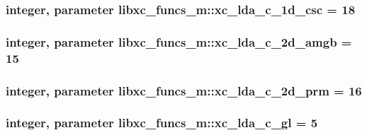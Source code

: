 \hypertarget{classlibxc__funcs__m_ac253e07010d2eb729a0c1870073026d8}{
\subsubsection[{xc\-\_\-lda\-\_\-c\-\_\-1d\-\_\-csc}]{\setlength{\rightskip}{0pt plus 5cm}integer, parameter libxc\-\_\-funcs\-\_\-m\-::xc\-\_\-lda\-\_\-c\-\_\-1d\-\_\-csc = 18}}\label{classlibxc__funcs__m_ac253e07010d2eb729a0c1870073026d8}
\hypertarget{classlibxc__funcs__m_a48adc34580788ace464a6380f36e2876}{
\subsubsection[{xc\-\_\-lda\-\_\-c\-\_\-2d\-\_\-amgb}]{\setlength{\rightskip}{0pt plus 5cm}integer, parameter libxc\-\_\-funcs\-\_\-m\-::xc\-\_\-lda\-\_\-c\-\_\-2d\-\_\-amgb = 15}}\label{classlibxc__funcs__m_a48adc34580788ace464a6380f36e2876}
\hypertarget{classlibxc__funcs__m_a593e255bea3463920a8a450d2f81076a}{
\subsubsection[{xc\-\_\-lda\-\_\-c\-\_\-2d\-\_\-prm}]{\setlength{\rightskip}{0pt plus 5cm}integer, parameter libxc\-\_\-funcs\-\_\-m\-::xc\-\_\-lda\-\_\-c\-\_\-2d\-\_\-prm = 16}}\label{classlibxc__funcs__m_a593e255bea3463920a8a450d2f81076a}
\hypertarget{classlibxc__funcs__m_aafaa72ece19c0113cd8ec81b69f7f407}{
\subsubsection[{xc\-\_\-lda\-\_\-c\-\_\-gl}]{\setlength{\rightskip}{0pt plus 5cm}integer, parameter libxc\-\_\-funcs\-\_\-m\-::xc\-\_\-lda\-\_\-c\-\_\-gl = 5}}\label{classlibxc__funcs__m_aafaa72ece19c0113cd8ec81b69f7f407}
